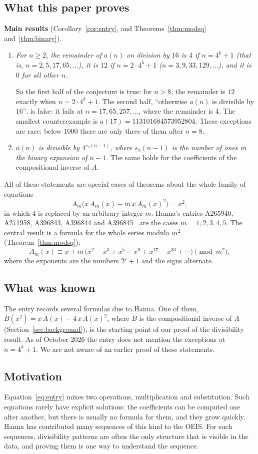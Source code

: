 \documentclass[11pt,a4paper]{article}
\theoremstyle{definition}
\theoremstyle{remark}
\begin{document}
\subsection{What this paper proves}
\textbf{Main results} (Corollary~\ref{cor:entry}, and Theorems~\ref{thm:modsq} and~\ref{thm:binary}).
\begin{enumerate}
\item \emph{For $n\ge2$, the remainder of $a(n)$ on division by $16$ is $4$ if $n=4^k+1$ (that is, $n=2,5,17,65,\dots$), it
is $12$ if $n=2\cdot4^k+1$ ($n=3,9,33,129,\dots$), and it is $0$ for all other $n$.}

So the first half of the conjecture is true: for $n>8$, the remainder is $12$ exactly when $n=2\cdot4^k+1$. The second
half, ``otherwise $a(n)$ is divisible by $16$'', is false: it fails at $n=17,65,257,\dots$, where the remainder is $4$.
The smallest counterexample is $a(17)=113101684573952804$. These exceptions are rare: below $1000$ there are only three
of them after $n=8$.
\item \emph{$a(n)$ is divisible by $4^{s_2(n-1)}$, where $s_2(n-1)$ is the number of ones in the binary expansion of
$n-1$.} The same holds for the coefficients of the compositional inverse of $A$.
\end{enumerate}

All of these statements are special cases of theorems about the whole family of equations
\[
A_m\bigl(x\,A_m(x)-m\,x\,A_m(x)^2\bigr)=x^2,
\]
in which $4$ is replaced by an arbitrary integer $m$. Hanna's entries A265940, A271958, A396843,
A396844 and A396845~\cite{oeis1,oeis2,oeis3,oeis4,oeis5} are the cases $m=1,2,3,4,5$. The central result is a
formula for the whole series modulo $m^2$ (Theorem~\ref{thm:modsq}):
\[
A_m(x)\equiv x+m\,\bigl(x^2-x^3+x^5-x^9+x^{17}-x^{33}+\cdots\bigr)\pmod{m^2},
\]
where the exponents are the numbers $2^j+1$ and the signs alternate.

\subsection{What was known}
The entry records several formulas due to Hanna. One of them, $B(x^2)=x\,A(x)-4\,x\,A(x)^2$, where $B$ is
the compositional inverse of $A$ (Section~\ref{sec:background}), is the starting point of our proof of the divisibility
result. As of October 2026 the entry does not mention the exceptions at $n=4^k+1$.
We are not aware of an earlier proof of these statements.

\subsection{Motivation}
Equation~\eqref{eq:entry} mixes two operations, multiplication and substitution. Such equations rarely have explicit
solutions: the coefficients can be computed one after another, but there is usually no formula for them, and they grow
quickly. Hanna has contributed many sequences of this kind to the OEIS. For such sequences, divisibility patterns are
often the only structure that is visible in the data, and proving them is one way to understand the sequence.
\end{document}
